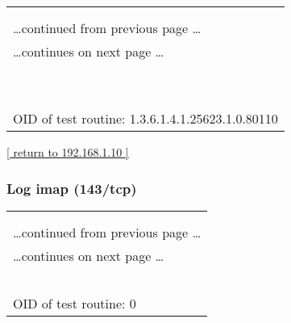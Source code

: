 \documentclass{article}
\begin{document}
\begin{longtable}{|p{}|}
\hline
\rowcolor{openvas_log}{\color{white}{Log (CVSS: 0.0) }}\\
\rowcolor{openvas_log}{\color{white}{NVT: wapiti (NASL wrapper)}}\\
\hline
\endfirsthead
\hfill\ldots continued from previous page \ldots \\
\hline
\endhead
\hline
\ldots continues on next page \ldots \\
\endfoot
\hline
\endlastfoot
\\
\rowcolor{white}{\verb=wapiti could not be found in your system path.=}\\
\rowcolor{white}{\verb=OpenVAS was unable to execute wapiti and to perform the scan you=}\\
\rowcolor{white}{\verb=requested.=}\\
\rowcolor{white}{\verb=Please make sure that wapiti is installed and that wapiti is=}\\
\rowcolor{white}{\verb=available in the PATH variable defined for your environment.=}\\
\rowcolor{white}{\verb==}\\
\rowcolor{white}{\verb==}\\
\\
OID of test routine: 1.3.6.1.4.1.25623.1.0.80110\\
\end{longtable}

\begin{footnotesize}\hyperref[host:192.168.1.10]{[ return to 192.168.1.10 ]}\end{footnotesize}
\subsubsection{Log imap (143/tcp)}
\label{port:192.168.1.10 imap (143/tcp) Log}

\begin{longtable}{|p{}|}
\hline
\rowcolor{openvas_log}{\color{white}{Log}}\\
\rowcolor{openvas_log}{\color{white}{NVT: }}\\
\hline
\endfirsthead
\hfill\ldots continued from previous page \ldots \\
\hline
\endhead
\hline
\ldots continues on next page \ldots \\
\endfoot
\hline
\endlastfoot
\\
\rowcolor{white}{\verb=Open port.=}\\
\rowcolor{white}{\verb==}\\
\rowcolor{white}{\verb==}\\
\\
OID of test routine: 0\\
\end{longtable}
\end{document}
